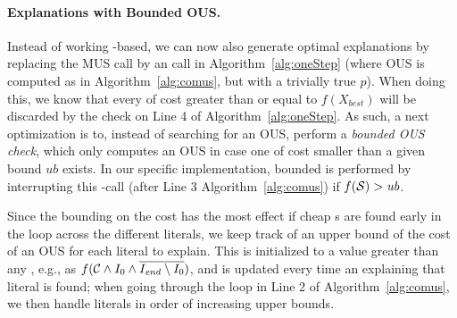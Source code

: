 \paragraph{Explanations with Bounded OUS.}
Instead of working \comus-based, we can now also generate optimal explanations by replacing the MUS call by an \omus call  in Algorithm~\ref{alg:oneStep} (where OUS is computed as in Algorithm~\ref{alg:comus}, but with a trivially true $p$). 
When doing this, we know that every \comus of cost greater than or equal to $f(X_{\mathit{best}})$ will be discarded by the check on Line 4 of Algorithm~\ref{alg:oneStep}.
As such, a next optimization is to, instead of searching for an OUS, perform a \emph{bounded OUS check}, which only computes an OUS in case one of cost smaller than a given bound $\mathit{ub}$ exists.  
In our specific implementation, bounded \omus is performed by interrupting this \omus-call (after Line 3 Algorithm~\ref{alg:comus}) if $f(\mathcal{S}) > \mathit{ub}$.

Since the bounding on the \omus cost has the most effect if cheap \omus{}s are found early in the loop across the different literals, we keep track of an upper bound of the cost of an OUS for each literal to explain. This is initialized to a value greater than any \omus, e.g., as $f(\mathcal{C}  \land I_0 \land \overline{I_\mathit{end}  \setminus I_0})$, and is updated every time an \omus explaining that literal is found; when going through the loop in Line 2 of Algorithm~\ref{alg:comus}, we then handle literals in order of increasing upper bounds.



